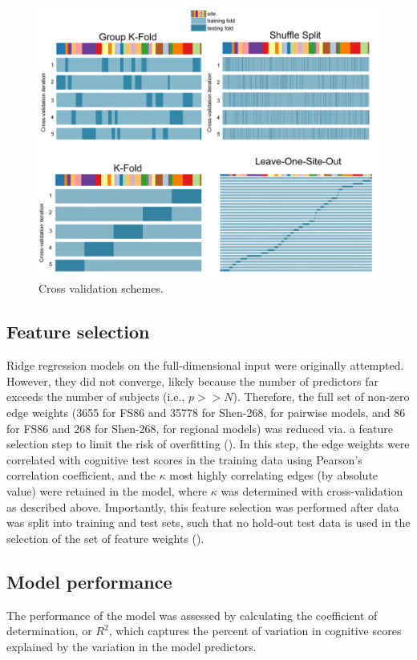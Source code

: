 \documentclass[10pt]{article}
\begin{document}
\begin{figure}[htp]
\centering
\includegraphics[width=1.0\linewidth]{figures/CrossValidations.png}
\caption{Cross validation schemes.}
\label{nemotool}
\end{figure}

\subsection{Feature selection}
Ridge regression models on the full-dimensional input were originally attempted. However, they did not converge, likely because the number of predictors far exceeds the number of subjects (i.e., $p >> N$). Therefore, the full set of non-zero edge weights (3655 for FS86 and 35778 for Shen-268, for pairwise models, and 86 for FS86 and 268 for Shen-268, for regional models) was reduced via. a feature selection step to limit the risk of overfitting (\cite{Calesella2021-kp}). In this step, the edge weights were correlated with cognitive test scores in the training data using Pearson's correlation coefficient, and the $\kappa$ most highly correlating edges (by absolute value) were retained in the model, where $\kappa$ was determined with cross-validation as described above. Importantly, this feature selection was performed after data was split into training and test sets, such that no hold-out test data is used in the selection of the set of feature weights (\cite{Hastie2001-or}). 

\subsection{Model performance}
The performance of the model was assessed by calculating the coefficient of determination, or $R^2$, which captures the percent of variation in cognitive scores explained by the variation in the model predictors. 
\end{document}
